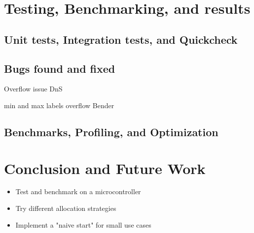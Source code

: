 \documentclass[12pt]{article}
\begin{document}
\newpage
\section{Testing, Benchmarking, and results}

\subsection{Unit tests, Integration tests, and Quickcheck}

\subsection{Bugs found and fixed}

Overflow issue DnS

min and max labels overflow Bender

\subsection{Benchmarks, Profiling, and Optimization}


\newpage
\section{Conclusion and Future Work}

\begin{itemize}
  \item Test and benchmark on a microcontroller
  \item Try different allocation strategies
  \item Implement a "naive start" for small use cases
\end{itemize}

\newpage
\printbibliography
\end{document}
